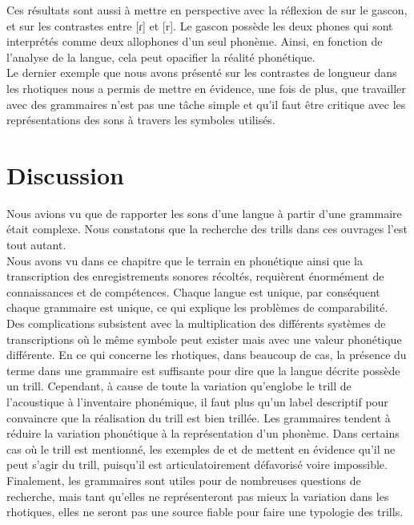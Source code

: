 
Ces résultats sont aussi à mettre en perspective avec la réflexion de \textcite{labruneConsonnesRhotiquesGascon} sur le gascon, et sur les contrastes entre [ɾ] et [r]. Le gascon possède les deux phones qui sont interprétés comme deux allophones d'un seul phonème. Ainsi, en fonction de l'analyse de la langue, cela peut opacifier la réalité phonétique.\\

Le dernier exemple que nous avons présenté sur les contrastes de longueur dans les rhotiques nous a permis de mettre en évidence, une fois de plus, que travailler avec des grammaires n'est pas une tâche simple et qu'il faut être critique avec les représentations des sons à travers les symboles utilisés.

\section{Discussion}

Nous avions vu que de rapporter les sons d'une langue à partir d'une grammaire était complexe. Nous constatons que la recherche des trills dans ces ouvrages l'est tout autant.\\

Nous avons vu dans ce chapitre que le terrain en phonétique ainsi que la transcription des enregistrements sonores récoltés, requièrent énormément de connaissances et de compétences. 
Chaque langue est unique, par conséquent chaque grammaire est unique, ce qui explique les problèmes de comparabilité.\\

Des complications subsistent avec la multiplication des différents systèmes de transcriptions où le même symbole peut exister mais avec une valeur phonétique différente.
En ce qui concerne les rhotiques, dans beaucoup de cas, la présence du terme  dans une grammaire est suffisante pour dire que la langue décrite possède un trill. Cependant, à cause de toute la variation qu'englobe le trill de l'acoustique à l'inventaire phonémique, il faut plus qu'un label descriptif pour convaincre que la réalisation du trill est bien trillée. Les grammaires tendent à réduire la variation phonétique à la représentation d'un phonème. 
Dans certains cas où le trill est mentionné, les exemples de  et de  mettent en évidence qu'il ne peut s'agir du trill, puisqu'il est articulatoirement défavorisé voire impossible.\\

Finalement, les grammaires sont utiles pour de nombreuses questions de recherche, mais tant qu'elles ne représenteront pas mieux la variation dans les rhotiques, elles ne seront pas une source fiable pour faire une typologie des trills.



